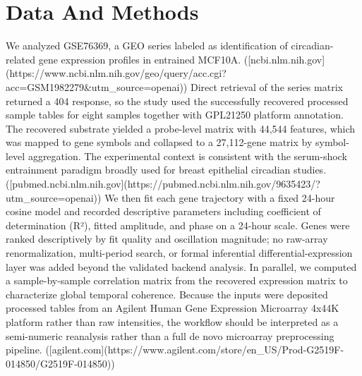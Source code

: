 \documentclass[11pt]{article}
\begin{document}
\section{Data And Methods}
We analyzed GSE76369, a GEO series labeled as identification of circadian-related gene expression profiles in entrained MCF10A. ([ncbi.nlm.nih.gov](https://www.ncbi.nlm.nih.gov/geo/query/acc.cgi?acc=GSM1982279\&utm\_source=openai)) Direct retrieval of the series matrix returned a 404 response, so the study used the successfully recovered processed sample tables for eight samples together with GPL21250 platform annotation. The recovered substrate yielded a probe-level matrix with 44,544 features, which was mapped to gene symbols and collapsed to a 27,112-gene matrix by symbol-level aggregation. The experimental context is consistent with the serum-shock entrainment paradigm broadly used for breast epithelial circadian studies. ([pubmed.ncbi.nlm.nih.gov](https://pubmed.ncbi.nlm.nih.gov/9635423/?utm\_source=openai)) We then fit each gene trajectory with a fixed 24-hour cosine model and recorded descriptive parameters including coefficient of determination (R²), fitted amplitude, and phase on a 24-hour scale. Genes were ranked descriptively by fit quality and oscillation magnitude; no raw-array renormalization, multi-period search, or formal inferential differential-expression layer was added beyond the validated backend analysis. In parallel, we computed a sample-by-sample correlation matrix from the recovered expression matrix to characterize global temporal coherence. Because the inputs were deposited processed tables from an Agilent Human Gene Expression Microarray 4x44K platform rather than raw intensities, the workflow should be interpreted as a semi-numeric reanalysis rather than a full de novo microarray preprocessing pipeline. ([agilent.com](https://www.agilent.com/store/en\_US/Prod-G2519F-014850/G2519F-014850))
\end{document}
